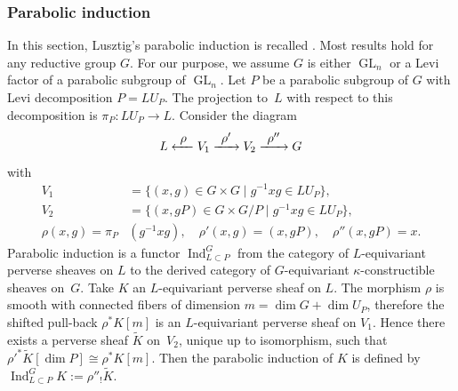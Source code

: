 \documentclass[11pt]{article}
\def\To#1{\mathchoice{\xrightarrow{\textstyle\kern4pt#1\kern3pt}}{\stackrel{#1}{\longrightarrow}}{}{}}
\def\From#1{\mathchoice{\xleftarrow{\textstyle~#1~}}{\stackrel{#1}{\longleftarrow}}{}{}}
\theoremstyle{definition}
\theoremstyle{plain}
\DeclareMathOperator{\Ind}{Ind}
\DeclareMathOperator{\GL}{GL}
\newcommand{\inv}{^{-1}}
\begin{document}
\subsubsection{Parabolic induction}
In this section, Lusztig's parabolic induction is recalled \cite{Lusztig1984,lusztig_character_sheaves,Lusztig1986}. Most results hold for any reductive group $G$. For our purpose, we assume $G$ is either $\GL_n$ or a Levi factor of a parabolic subgroup of $\GL_n$. Let $P$ be a parabolic subgroup of $G$ with Levi decomposition $P=L U_P$. The projection to~$L$ with respect to this decomposition is $\pi_{P}: L U_P\to L$. Consider the diagram
\begin{equation}\label{parabolic_induction_diagramm}
L \From{\rho} V_1 \To{\rho'} V_2 \To{\rho''} G
\end{equation}
with
\begin{align*}
V_1&=\lbrace (x,g)\in G\times G \mid g\inv x g \in L U_P\rbrace, \\
V_2 &=\lbrace (x, g P)\in G\times G/P \mid g\inv x g \in L U_P\rbrace,\\
\rho(x,g)=\pi_{P}&(g\inv x g), \quad \rho'(x,g)= (x,g P), \quad
\rho''(x,g P)=x.
\end{align*}
Parabolic induction is a functor $\Ind_{L\subset P}^{G}$ from the category of $L$-equivariant perverse sheaves on $L$ to the derived category of $G$-equivariant $\kappa$-constructible sheaves on~$G$.
Take $K$ an $L$-equivariant perverse sheaf on $L$. The morphism $\rho$ is smooth with connected fibers of dimension $m=\dim G +\dim U_P$, therefore the shifted pull-back $\rho^* K[m]$ is an $L$-equivariant perverse sheaf on $V_1$. Hence there exists a perverse sheaf $\widetilde{K}$ on~$V_2$, unique up to isomorphism, such that $\rho'^* \widetilde{K}[\dim P] \cong \rho^* K[m]$. Then the parabolic induction of $K$ is defined by $\Ind_{L \subset P}^{G} K := \rho''_{!}\widetilde{K}$.
\end{document}
